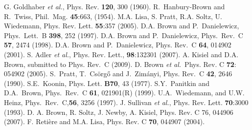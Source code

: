 \documentclass[aps,prl,twocolumn,floatfix,preprintnumbers,showpacs]{revtex4}
\newcommand{\etal}{{\em et al.}}
\begin{document}
\begin{thebibliography}{70}
G. Goldhaber {\em et al.}, Phys. Rev. {\bf 120}, 300 (1960).
R.~Hanbury-Brown and R.~Twiss, Phil.~Mag. {\bf 45}:663, (1954).
M.A. Lisa, S. Pratt, R.A. Soltz, U. Wiedemann, Phys. Rev. Lett. {\bf 55}:357 (2005).
D.A. Brown and P.~Danielewicz, Phys.~Lett.~B {\bf 398}, 252 (1997).
D.A. Brown and P.~Danielewicz, Phys.~Rev.~C {\bf 57}, 2474 (1998).
D.A. Brown and P.~Danielewicz, Phys. Rev.~C {\bf 64}, 014902 (2001).
S. Adler {\it et al.}, Phys. Rev. Lett., {\bf 98}:132301 (2007).
A. Kisiel and D.A. Brown, submitted to Phys. Rev.~C (2009).
D. Brown \etal\ Phys. Rev. C {\bf 72}: 054902 (2005).
S.~Pratt, T.~Cs{\"o}rg\H{o} and J.~Zim\'{a}nyi, Phys. Rev.~C {\bf 42}, 2646 (1990). 
S.E.~Koonin, Phys. Lett. {\bf B70}, 43 (1977).
 S.Y.~Panitkin and D.A.~Brown, Phys.~Rev.~C {\bf 61}, 021901(R) (1999).
 U.A.~Wiedemann, and U.W. Heinz, Phys.~Rev.~C,{\bf 56}, 3256 (1997).
J. Sullivan  {\it et al.}, Phys. Rev. Lett. {\bf 70}:3000 (1993).
 D. A. Brown, R. Soltz, J. Newby, A. Kisiel, Phys. Rev. C {76}, 044906 (2007).     
F. Reti\`{e}re and M.A. Lisa, Phys. Rev. C {\bf 70}, 044907 (2004).
\end{thebibliography}

\end{document}
